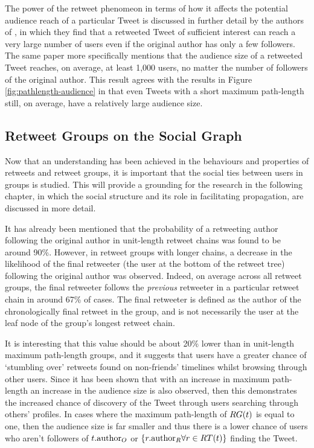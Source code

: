 The power of the retweet phenomeon in terms of how it affects the potential audience reach of a particular Tweet is discussed in further detail by the authors of \cite{kwak10}, in which they find that a retweeted Tweet of sufficient interest can reach a very large number of users even if the original author has only a few followers. The same paper more specifically mentions that the audience size of a retweeted Tweet reaches, on average, at least 1,000 users, no matter the number of followers of the original author. This result agrees with the results in Figure \ref{fig:pathlength-audience} in that even Tweets with a short maximum path-length still, on average, have a relatively large audience size.


\subsection{Retweet Groups on the Social Graph}
\label{section:retweets_graph}
Now that an understanding has been achieved in the behaviours and properties of retweets and retweet groups, it is important that the social ties between users in groups is studied. This will provide a grounding for the research in the following chapter, in which the social structure and its role in facilitating propagation, are discussed in more detail.

It has already been mentioned that the probability of a retweeting author following the original author in unit-length retweet chains was found to be around 90\%. However, in retweet groups with longer chains, a decrease in the likelihood of the final retweeter (the user at the bottom of the retweet tree) following the original author was observed. Indeed, on average across all retweet groups, the final retweeter follows the \textit{previous} retweeter in a particular retweet chain in around 67\% of cases. The final retweeter is defined as the author of the chronologically final retweet in the group, and is not necessarily the user at the leaf node of the group's longest retweet chain.


It is interesting that this value should be about 20\% lower than in unit-length maximum path-length groups, and it suggests that users have a greater chance of `stumbling over' retweets found on non-friends' timelines whilst browsing through other users. Since it has been shown that with an increase in maximum path-length an increase in the audience size is also observed, then this demonstrates the increased chance of discovery of the Tweet through users searching through others' profiles. In cases where the maximum path-length of $RG(t)$ is equal to one, then the audience size is far smaller and thus there is a lower chance of users who aren't followers of $t.\textrm{author}_O$ or $\left\{r.\textrm{author}_R \forall r \in RT(t)\right\}$ finding the Tweet.

